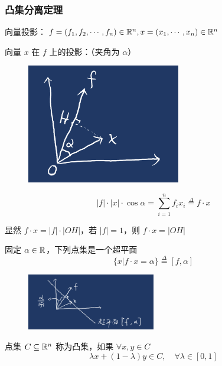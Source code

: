 \subsubsection{凸集分离定理}

向量投影：$f=(f_1,f_2,\cdots,f_n)\in\mathbb{R}^n, x=(x_1,\cdots,x_n)\in \mathbb{R}^n$

向量 $x$ 在 $f$ 上的投影：（夹角为 $\alpha$）

\vspace{1em}

\begin{minipage}{0.5\textwidth}
    \begin{figure}[H]
        \centering
        \includegraphics[width=0.6\textwidth]{figures/向量投影.jpeg} %
    \end{figure}
\end{minipage}
\begin{minipage}{0.5\textwidth}
    \[
    |f|\cdot |x|\cdot \cos\alpha=\sum_{i=1}^n f_ix_i\overset{\Delta}{=}f\cdot x
    \]
\end{minipage}

\vspace{1em}

显然 $f\cdot x=|f|\cdot |OH|$，若 $|f|=1$，则 $f\cdot x=|OH|$

固定 $\alpha\in \mathbb{R}$，下列点集是一个超平面
\[
\{x|f\cdot x=\alpha\}\overset{\Delta}{=}[f,\alpha]
\]
\begin{figure}[H]
    \centering
    \includegraphics[width=0.5\textwidth]{figures/超平面.jpeg} %
\end{figure}
\begin{definition}[凸集]
    点集 $C\subseteq \mathbb{R}^n$ 称为凸集，如果 $\forall x,y\in C$
    \[
    \lambda x+(1-\lambda)y\in C,\quad \forall \lambda\in [0,1]
    \]
\end{definition}

